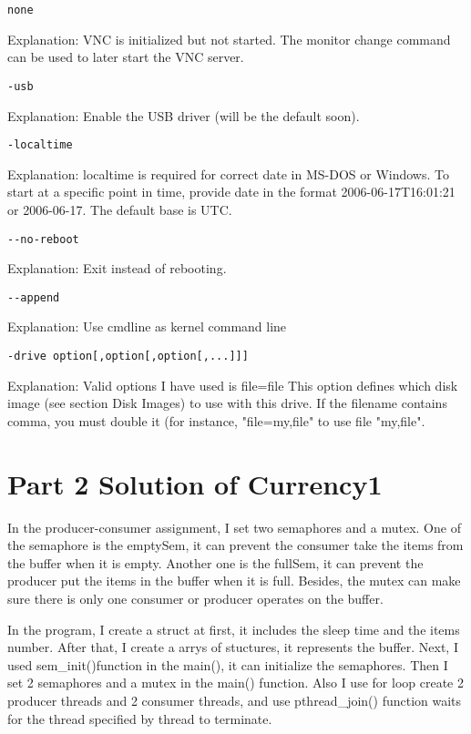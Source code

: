 \documentclass[10pt,draftclsnofoot,peerreview,letterpaper,onecolumn,]{IEEEtran}
\begin{document}
\begin{verbatim}none\end{verbatim}
Explanation: VNC is initialized but not started. The monitor change command can be used to later start the VNC server.

\begin{verbatim}
-usb
\end{verbatim}
Explanation: Enable the USB driver (will be the default soon).

\begin{verbatim}
-localtime
\end{verbatim}
Explanation: localtime is required for correct date in MS-DOS or Windows. To start at a specific point in time, provide date in the format 2006-06-17T16:01:21 or 2006-06-17. The default base is UTC.

\begin{verbatim}
--no-reboot
\end{verbatim}
Explanation: Exit instead of rebooting.

\begin{verbatim}
--append
\end{verbatim}
Explanation: Use cmdline as kernel command line

\begin{verbatim}
-drive option[,option[,option[,...]]]
\end{verbatim}
Explanation: Valid options I have used is \:
file=file
This option defines which disk image (see section Disk Images) to use with this drive. If the filename contains comma, you must double it (for instance, "file=my,file" to use file "my,file".


\newpage
\section{Part 2 Solution of Currency1}

In the producer-consumer assignment, I set two semaphores and a mutex. One of the semaphore is the emptySem, it can prevent the consumer take the items from the buffer when it is empty. Another one is the fullSem, it can prevent the producer put the items in the buffer when it is full. Besides, the mutex can make sure there is only one consumer or producer operates on the buffer.

In the program, I create a struct at first, it includes the sleep time and the items number. After that, I create a arrys of stuctures, it represents the buffer. Next, I used sem\_init()function in the main(), it can initialize the semaphores. Then I set 2 semaphores and a mutex in the main() function. Also I use for loop create 2 producer threads and 2 consumer threads, and use pthread\_join() function waits for the thread specified by thread to terminate.
\end{document}
